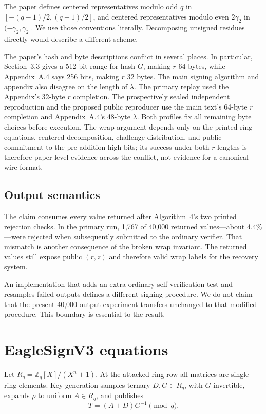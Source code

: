 \documentclass[10pt,a4paper]{article}
\newcommand{\Rq}{R_q}
\begin{document}
The paper defines centered representatives modulo odd $q$ in
$[-(q-1)/2,(q-1)/2]$, and centered representatives modulo even
$2\gamma_2$ in $(-\gamma_2,\gamma_2]$. We use those conventions literally.
Decomposing unsigned residues directly would describe a different scheme.

The paper's hash and byte descriptions conflict in several places. In
particular, Section~3.3 gives a 512-bit range for hash $G$, making $r$ 64
bytes, while Appendix~A.4 says 256 bits, making $r$ 32 bytes. The main signing
algorithm and appendix also disagree on the length of $\lambda$. The primary
replay used the Appendix's 32-byte $r$ completion. The prospectively sealed
independent reproduction and the proposed public reproducer use the main
text's 64-byte $r$ completion and Appendix~A.4's 48-byte $\lambda$. Both
profiles fix all remaining byte choices before execution. The wrap argument
depends only on the printed ring equations, centered decomposition, challenge
distribution, and public commitment to the pre-addition high bits; its success
under both $r$ lengths is therefore paper-level evidence across the conflict,
not evidence for a canonical wire format.

\subsection{Output semantics}

The claim consumes every value returned after Algorithm~4's two printed
rejection checks. In the primary run, 1,767 of 40,000 returned values---about
4.4\%---were rejected when subsequently submitted to the ordinary verifier.
That mismatch is another consequence of the broken wrap invariant. The
returned values still expose public $(r,z)$ and therefore valid wrap labels
for the recovery system.

An implementation that adds an extra ordinary self-verification test and
resamples failed outputs defines a different signing procedure. We do not
claim that the present 40,000-output experiment transfers unchanged to that
modified procedure. This boundary is essential to the result.

\section{EagleSignV3 equations}

Let $\Rq=\mathbb Z_q[X]/(X^n+1)$. At the attacked ring row all matrices are
single ring elements. Key generation samples ternary $D,G\in\Rq$, with $G$
invertible, expands $\rho$ to uniform $A\in\Rq$, and publishes
\[
  T=(A+D)G^{-1}\pmod q.
\]
\end{document}

